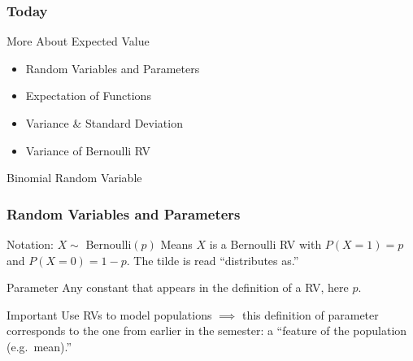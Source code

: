 \documentclass[handout]{beamer}
\begin{document}


\begin{frame}
\frametitle{Today}
\begin{block}{More About Expected Value}
	\begin{itemize}
		\item Random Variables and Parameters
		\item Expectation of Functions
		\item Variance \& Standard Deviation
		\item Variance of Bernoulli RV
	\end{itemize}

\end{block}
\begin{block}{Binomial Random Variable}
\end{block}

\end{frame}

\begin{frame}
\frametitle{Random Variables and Parameters}



\begin{block}{Notation: $X \sim$ Bernoulli$(p)$}
Means $X$ is a Bernoulli RV with $P(X = 1) = p$ and $P(X= 0) = 1-p$. The tilde is read ``distributes as.''

\end{block}


\begin{block}{Parameter}
Any constant that appears in the definition of a RV, here $p$. 
\end{block}


\begin{alertblock}{Important}
	Use RVs to model populations $\implies$ this definition of parameter corresponds to the one from earlier in the semester: a ``feature of the population (e.g.\ mean).''
\end{alertblock}


\end{frame}
\end{document}
